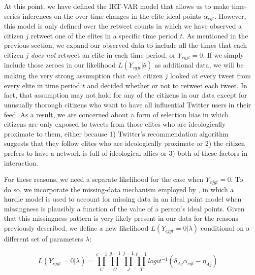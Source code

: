 \documentclass[12pt]{article}
\begin{document}
At this point, we have defined the IRT-VAR model that allows us to make time-series inferences on the over-time changes in the elite ideal points $\alpha_{cgt}$. However, this model is only defined over the retweet counts in which we have observed a citizen $j$ retweet one of the elites in a specific time period $t$. As mentioned in the previous section, we expand our observed data to include all the times that each citizen $j$ \emph{does not} retweet an elite in each time period, or $Y_{cgjt}=0$. If we simply include those zeroes in our likelihood $L(Y_{cgjt}|\theta)$ as additional data, we will be making the very strong assumption that each citizen $j$ looked at every tweet from every elite in time period $t$ and decided whether or not to retweet each tweet. In fact, that assumption may not hold for any of the citizens in our data except for unusually thorough citizens who want to have all influential Twitter users in their feed. As a result, we are concerned about a form of selection bias in which citizens are only exposed to tweets from those elites who are ideologically proximate to them, either because 1) Twitter's recommendation algorithm suggests that they follow elites who are ideologically proximate or 2) the citizen prefers to have a network is full of ideological allies or 3) both of these factors in interaction. 

For these reasons, we need a separate likelihood for the case when $Y_{cjgt}=0$. To do so, we incorporate the missing-data mechanism employed by \textcite{kubinec2017}, in which a hurdle model is used to account for missing data in an ideal point model when missingness is plausibly a function of the value of a person's ideal points. Given that this missingness pattern is very likely present in our data for the reasons previously described, we define a new likelihood $L(Y_{cjgt}=0|\lambda)$ conditional on a different set of parameters $\lambda$:

\begin{equation}
L(Y_{cjgt}=0|\lambda) = \prod^{c=1}_C \prod^{g=1}_G \prod^{j=1}_J  \prod^{t=1}_T logit^{-1}(\delta_{Aj}  \alpha_{cgt} - \eta_{Aj})
\end{equation}
\end{document}
